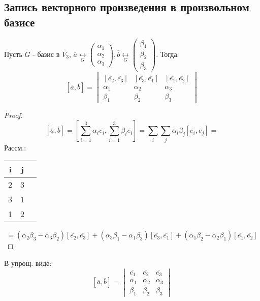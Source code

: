 \subsection{Запись векторного произведения в произвольном базисе}
\begin{theorem}
Пусть $G$ - базис в $V_3$, $\overline{a} \underset{G}{\longleftrightarrow} \begin{pmatrix}\alpha_1 \\ \alpha_2 \\ \alpha_3 \end{pmatrix}, \overline{b} \underset{G}{\longleftrightarrow} \begin{pmatrix}\beta_1 \\ \beta_2 \\ \beta_3\end{pmatrix}$. Тогда:
\[
  [\overline{a}, \overline{b}] = \begin{vmatrix}[\overline{e_2}, \overline{e_3}] & \overline{[\overline{e_3}, \overline{e_1}]} & [\overline{e_1}, \overline{e_2}] \\ \alpha_1 & \alpha_2 & \alpha_3 \\ \beta_1 & \beta_2 & \beta_3 \end{vmatrix}
\]
\end{theorem}
\begin{proof}
\[
[\overline{a}, \overline{b}] = \left[\sum_{i = 1}^{3}\alpha_i \overline{e_i}, \sum_{i = 1}^{3} \beta_i \overline{e_i}\right] = \sum_{i}^{}\sum_{j}^{} \alpha_i \beta_j [\overline{e_i}, \overline{e_j}] = 
\]
Рассм.:
\begin{center}
\begin{tabular}{ |c|c|c| } 
 \hline
 i & j \\
 \hline
 2 & 3 \\
 \hline
 3 & 1 \\ 
 \hline
 1 & 2 \\
 \hline
\end{tabular}
\end{center}
\[
 = (\alpha_2 \beta_3 - \alpha_3 \beta_2) [\overline{e_2}, \overline{e_3}] + (\alpha_3 \beta_1 - \alpha_1 \beta_3) [\overline{e_3}, \overline{e_1}] + (\alpha_1 \beta_2 - \alpha_2 \beta_1) [\overline{e_1}, \overline{e_2}]
\]
\end{proof}
\begin{note}
В упрощ. виде:
\[
  [\overline{a}, \overline{b}] = \begin{vmatrix}\overline{e_1} & \overline{e_2} & \overline{e_3} \\ \alpha_1 & \alpha_2 & \alpha_3 \\ \beta_1 & \beta_2 & \beta_3 \end{vmatrix}
\]
\end{note}

